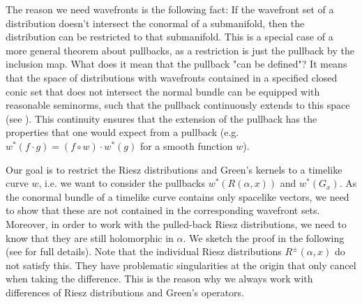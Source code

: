 \documentclass[11pt]{article}
\begin{document}
The reason we need wavefronts is the following fact: If the wavefront set of a distribution doesn't intersect the conormal of a submanifold, then the distribution can be restricted to that submanifold. This is a special case of a more general theorem about pullbacks, as a restriction is just the pullback by the inclusion map. What does it mean that the pullback "can be defined"? It means that the space of distributions with wavefronts contained in a specified closed conic set that does not intersect the normal bundle can be equipped with reasonable seminorms, such that the pullback continuously extends to this space (see \cite[Proposition 5.1]{BDH}). This continuity ensures that the extension of the pullback has the properties that one would expect from a pullback (e.g. $w^*(f\cdot g)=(f\circ w)\cdot w^*(g)$ for a smooth function $w$).

Our goal is to restrict the Riesz distributions and Green's kernels to a timelike curve $w$, i.e. we want to consider the pullbacks $w^*(R(\alpha,x))$ and $w^*(G_x)$. As the conormal bundle of a timelike curve contains only spacelike vectors, we need to show that these are not contained in the corresponding wavefront sets. Moreover, in order to work with the pulled-back Riesz distributions, we need to know that they are still holomorphic in $\alpha$. We sketch the proof in the following (see \cite[Section 4.1]{Ron} for full details). Note that the individual Riesz distributions $R^\pm(\alpha,x)$ do not satisfy this. They have problematic singularities at the origin that only cancel when taking the difference. This is the reason why we always work with differences of Riesz distributions and Green's operators.
\end{document}
